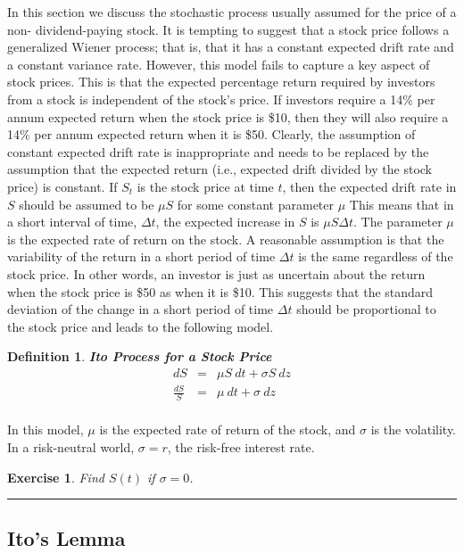 \documentclass[letterpaper,10pt]{article}
\newtheorem{df}{Definition}[section]
\newtheorem{ex}{Exercise}
\begin{document}
\noindent In this section we discuss the stochastic process usually assumed for the price of a non- dividend-paying stock.
It is tempting to suggest that a stock price follows a generalized Wiener process; that is, that it has a constant expected drift rate and a constant variance rate. However, this model fails to capture a key aspect of stock prices. This is that the expected percentage return required by investors from a stock is independent of the stock’s price. If investors require a 14\% per annum expected return when the stock price is \$10, then they will also require a 14\% per annum expected return when it is \$50.
Clearly, the assumption of constant expected drift rate is inappropriate and needs to be replaced by the assumption that the expected return (i.e., expected drift divided by the stock price) is constant. If $S_t$ is the stock price at time $t$, then the expected drift rate in $S$ should be assumed to be $\mu S$ for some constant parameter $\mu$ This means that in a short interval of time, $\Delta t$, the expected increase in $S$ is $\mu S\Delta t$. The parameter $\mu$ is the expected rate of return on the stock.  A reasonable assumption is that the variability of the return in a short period of time $\Delta t$ is the same regardless of the stock price. In other words, an investor is just as uncertain about the return when the stock price is \$50 as when it is \$10. This suggests that the standard deviation of the change in a short period of time $\Delta t$ should be proportional to the stock price and leads to the following model.

\begin{df}{\bf Ito Process for a Stock Price}
\begin{eqnarray*}
dS&=&\mu S\:dt+\sigma S\:dz\\
\frac{dS}{S}&=&\mu \:dt+\sigma\:dz\\
\end{eqnarray*}
\end{df}

\noindent In this model, $\mu$ is the expected rate of return of the stock, and $\sigma$ is the volatility.  In a risk-neutral world, $\sigma=r$, the risk-free interest rate.

\begin{ex}
Find $S(t)$ if $\sigma=0$.
\end{ex}

\bigskip

\hrule

\bigskip

\subsection{Ito's Lemma}
\end{document}
